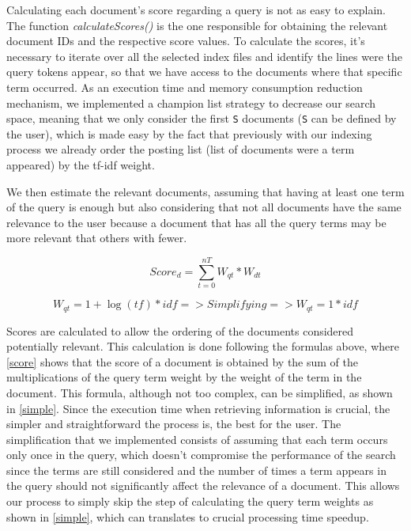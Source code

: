 \documentclass[12pt]{article}
\begin{document}
Calculating each document's score regarding a query is not as easy to explain. 
The function \textit{calculateScores()} is the one responsible for obtaining the 
relevant document IDs and the respective score values. 
To calculate the scores, it's necessary to iterate over all the selected index 
files and identify the lines were the query tokens appear, so that we have access 
to the documents where that specific term occurred.
As an execution time and memory consumption reduction mechanism, we implemented 
a champion list strategy to decrease our search space, meaning that we only 
consider the first \texttt{S} documents (\texttt{S} can be defined by the user), 
which is made easy by the fact that previously with our indexing process we 
already order the posting list (list of documents were a term appeared) by the 
tf-idf weight.

We then estimate the relevant documents, assuming that having at least one term 
of the query is enough but also considering that not all documents have the same 
relevance to the user because a document that has all the query terms may be more 
relevant that others with fewer.

\begin{equation}
  \label{score}
  Score_{d} = \sum_{t=0}^{nT} W_{qt} * W_{dt}
\end{equation}

\begin{equation}
  \label{simple}
  W_{qt} = 1 + \log(tf) * idf => Simplifying => W_{qt} = 1 * idf
\end{equation}

Scores are calculated to allow the ordering of the documents considered potentially
relevant. This calculation is done following the formulas above, where \ref{score} 
shows that the score of a document is obtained by the sum of the multiplications 
of the query term weight by the weight of the term in the document. 
This formula, although not too complex, can be simplified, as shown in \ref{simple}. 
Since the execution time when retrieving information is crucial, the simpler and 
straightforward the process is, the best for the user. 
The simplification that we implemented consists of assuming that each term occurs 
only once in the query, which doesn't compromise the performance of the search 
since the terms are still considered and the number of times a term appears in 
the query should not significantly affect the relevance of a document. 
This allows our process to simply skip the step of calculating the query term 
weights as shown in \ref{simple}, which can translates to crucial processing time speedup.
\end{document}
